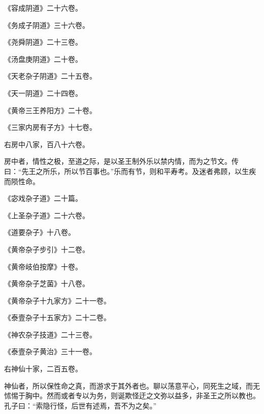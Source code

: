 \documentclass[12pt,UTF8]{ctexbook}
\begin{document}
《容成阴道》二十六卷。



《务成子阴道》三十六卷。



《尧舜阴道》二十三卷。



《汤盘庚阴道》二十卷。



《天老杂子阴道》二十五卷。



《天一阴道》二十四卷。



《黄帝三王养阳方》二十卷。



《三家内房有子方》十七卷。



右房中八家，百八十六卷。



房中者，情性之极，至道之际，是以圣王制外乐以禁内情，而为之节文。传曰：“先王之所乐，所以节百事也。”乐而有节，则和平寿考。及迷者弗顾，以生疾而陨性命。



《宓戏杂子道》二十篇。



《上圣杂子道》二十六卷。



《道要杂子》十八卷。



《黄帝杂子步引》十二卷。



《黄帝岐伯按摩》十卷。



《黄帝杂子芝菌》十八卷。



《黄帝杂子十九家方》二十一卷。



《泰壹杂子十五家方》二十二卷。



《神农杂子技道》二十三卷。



《泰壹杂子黄治》三十一卷。



右神仙十家，二百五卷。



神仙者，所以保性命之真，而游求于其外者也。聊以荡意平心，同死生之域，而无怵惕于胸中。然而或者专以为务，则诞欺怪迂之文弥以益多，非圣王之所以教也。孔子曰：“索隐行怪，后世有述焉，吾不为之矣。”
\end{document}
